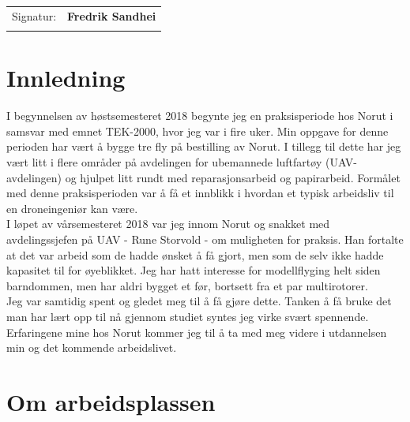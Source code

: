 \documentclass[12pt, a4paper]{article}
\begin{document}
\begin{flushleft}
	\begin{tabular}{@{}p{.5in}p{4in}@{}}
	Signatur: & \hspace{.5cm}\textbf{Fredrik Sandhei} \\
			  & \hrulefill \\
	\end{tabular}

\end{flushleft}

\clearpage

\tableofcontents
\newpage
\listoffigures

\clearpage


\section{Innledning}
I begynnelsen av høstsemesteret 2018 begynte jeg en praksisperiode hos Norut i samsvar med emnet TEK-2000, hvor jeg var i fire uker. Min oppgave for denne perioden har vært å bygge tre fly på bestilling av Norut. I tillegg til dette har jeg vært litt i flere områder på avdelingen for ubemannede luftfartøy (UAV-avdelingen) og hjulpet litt rundt med reparasjonsarbeid og papirarbeid. Formålet med denne praksisperioden var å få et innblikk i hvordan et typisk arbeidsliv til en droneingeniør kan være. \\

I løpet av vårsemesteret 2018 var jeg innom Norut og snakket med avdelingssjefen på UAV - Rune Storvold - om muligheten for praksis. Han fortalte at det var arbeid som de hadde ønsket å få gjort, men som de selv ikke hadde kapasitet til for øyeblikket. Jeg har hatt interesse for modellflyging helt siden barndommen, men har aldri bygget et før, bortsett fra et par multirotorer.\\

Jeg var samtidig spent og gledet meg til å få gjøre dette. Tanken å få bruke det man har lært opp til nå gjennom studiet syntes jeg virke svært spennende. Erfaringene mine hos Norut kommer jeg til å ta med meg videre i utdannelsen min og det kommende arbeidslivet. 


\newpage
\section{Om arbeidsplassen}
\end{document}
